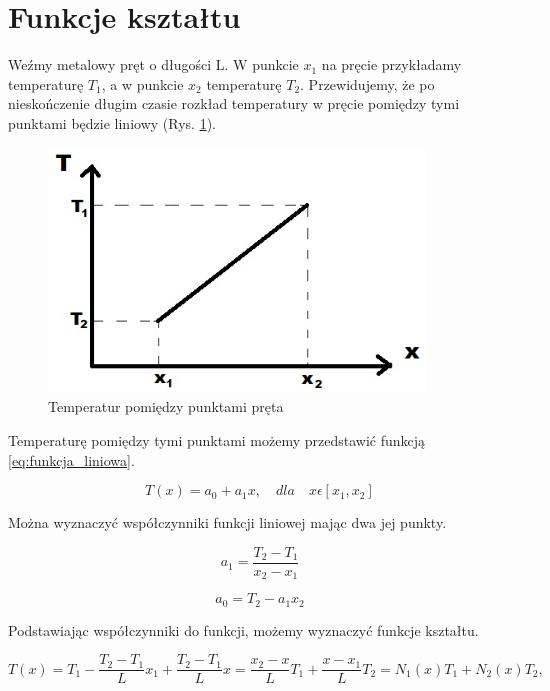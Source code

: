
\section{Funkcje kształtu}
\label{sec:funkcje_ksztaltu}

Weźmy metalowy pręt o długości L. W punkcie \(x_1\) na pręcie przykładamy temperaturę \( T_1 \), a w punkcie \(x_2\) temperaturę \( T_2 \). Przewidujemy, że po nieskończenie długim czasie rozkład temperatury w pręcie pomiędzy tymi punktami będzie liniowy (Rys. \ref{fig:temperatura_pret}).

\begin{figure}[h]
\centering
\includegraphics[width=10cm]{Zdjecia/3/rozklad_temperatury}
\caption{Temperatur pomiędzy punktami pręta}
\label{fig:temperatura_pret}
\end{figure}

Temperaturę pomiędzy tymi punktami możemy przedstawić funkcją \ref{eq:funkcja_liniowa}.

\begin{equation} \label{eq:funkcja_liniowa}
T(x)=a_0 + a_1 x, \quad dla \quad x \epsilon [x_1, x_2]
\end{equation}

Można wyznaczyć współczynniki funkcji liniowej mając dwa jej punkty.

\begin{equation}
a_1 = \frac{T_2 - T_1}{x_2 - x_1}
\end{equation}

\begin{equation}
a_0 = T_2 - a_1 x_2
\end{equation}

Podstawiając współczynniki do funkcji, możemy wyznaczyć funkcje kształtu.

\begin{equation}
T(x) = T_1 - \frac{T_2 - T_1}{L} x_1 + \frac{T_2 - T_1}{L} x = \frac{x_2 - x}{L}T_1 + \frac{x - x_1}{L}T_2 = N_1(x)T_1 + N_2(x)T_2,
\end{equation}

